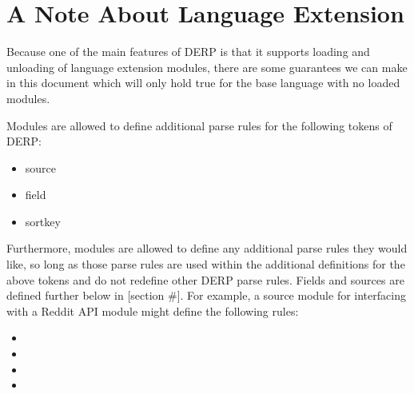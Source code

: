 \section{A Note About Language Extension}
Because one of the main features of DERP is that it supports loading and unloading
of language extension modules, there are some guarantees we can make in this document
which will only hold true for the base language with no loaded modules.

Modules are allowed to define additional parse rules for the following tokens of DERP:
\begin{itemize}
\item source
\item field
\item sortkey
\end{itemize}
Furthermore, modules are allowed to define any additional parse rules they would like, so
long as those parse rules are used within the additional definitions for the above tokens
and do not redefine other DERP parse rules. Fields and sources are defined further below in [section \#].
For example, a source module for interfacing with a Reddit API module might define the following rules:

\begin{itemize}[leftmargin=1in]
    \item[\nonterminal{source}] \bnf{:}   \bnf{|} 
    \item[\nonterminal{field}]\bnf{:}  \bnf{|}  \bnf{|}  \bnf{|}  
    \item[\nonterminal{nsfw}] \bnf{:}  \bnf{|} 
    \item[\nonterminal{sortkey}] \bnf{:}   
\end{itemize}
